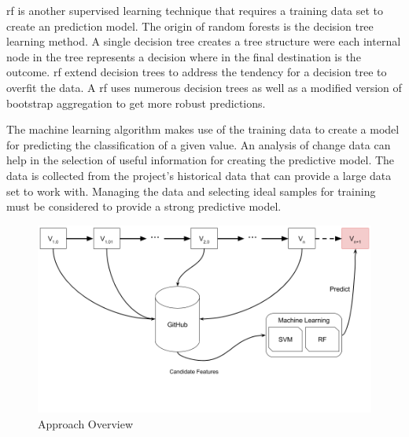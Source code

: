 \gls{rf} is another supervised learning technique that requires a training data set to create an prediction model. The origin of random forests is the decision tree learning method. A single decision tree creates a tree structure were each internal node in the tree represents a decision where in the final destination is the outcome. \gls{rf} extend decision trees to address the tendency for a decision tree to overfit the data. A \gls{rf} uses numerous decision trees as well as a modified version of bootstrap aggregation to get more robust predictions.



The machine learning algorithm makes use of the training data to create a model for predicting the classification of a given value. An analysis of change data can help in the selection of useful information for creating the predictive model. The data is collected from the project's historical data that can provide a large data set to work with. Managing the data and selecting ideal samples for training must be considered to provide a strong predictive model.

\begin{figure}[!ht]
    \centering
        \includegraphics[width=1.0\textwidth]{images/overview}
    \caption{Approach Overview}
    \label{fig:overview}
\end{figure}

